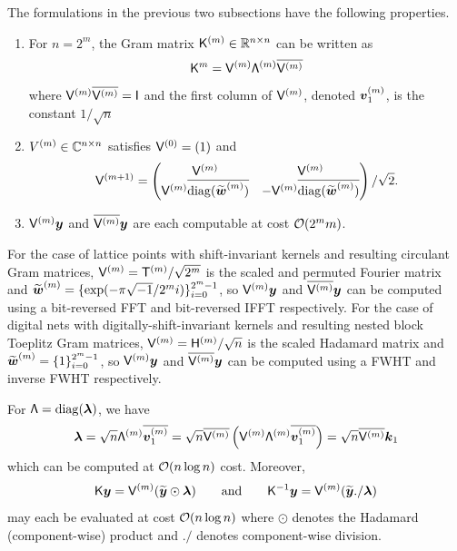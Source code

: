 \documentclass[acmsmall]{acmart}
\begin{document}
The formulations in the previous two subsections have the following properties. 
\begin{enumerate}
    \item For $n=2^m$, the Gram matrix ${\mathsf{K}}^{(m)} \in {\mathbb{R}}^{n \times n}$ can be written as
    $${\mathsf{K}}^{m} = {\mathsf{V}}^{(m)} {\mathsf{\Lambda}}^{(m)} \overline{{\mathsf{V}}^{(m)}}$$
    where ${\mathsf{V}}^{(m)} \overline{{\mathsf{V}}^{(m)}} = {\mathsf{I}}$ and the first column of ${\mathsf{V}}^{(m)}$, denoted ${\boldsymbol{v}}_1^{(m)}$, is the constant $1/\sqrt{n}$
    \item $V^{(m)} \in {\mathbb{C}}^{n \times n}$ satisfies ${\mathsf{V}}^{(0)} = (1)$ and 
    $${\mathsf{V}}^{(m+1)} = \begin{pmatrix} {\mathsf{V}}^{(m)} & {\mathsf{V}}^{(m)} \\  {\mathsf{V}}^{(m)} \overline{\mathrm{diag}({\widetilde{\boldsymbol{w}}}^{(m)})} & - {\mathsf{V}}^{(m)} \overline{\mathrm{diag}({\widetilde{\boldsymbol{w}}}^{(m)})} \end{pmatrix}/\sqrt{2}.$$
    \item ${\mathsf{V}}^{(m)} {\boldsymbol{y}}$ and $\overline{{\mathsf{V}}^{(m)}} {\boldsymbol{y}}$ are each computable at cost ${\mathcal{O}}(2^mm)$.
\end{enumerate}
For the case of lattice points with shift-invariant kernels and resulting circulant Gram matrices, ${\mathsf{V}}^{(m)} = {\mathsf{T}}^{(m)}/\sqrt{2^m}$ is the scaled and permuted Fourier matrix and ${\widetilde{\boldsymbol{w}}}^{(m)} = \{\exp(-\pi \sqrt{-1}/2^m i)\}_{i=0}^{2^m-1}$, so ${\mathsf{V}}^{(m)} {\boldsymbol{y}}$ and $\overline{{\mathsf{V}}^{(m)}} {\boldsymbol{y}}$ can be computed using a bit-reversed FFT and bit-reversed IFFT respectively. For the case of digital nets with 
digitally-shift-invariant kernels  and resulting nested block Toeplitz Gram matrices, ${\mathsf{V}}^{(m)} = {\mathsf{H}}^{(m)}/\sqrt{n}$ is the scaled Hadamard matrix and ${\widetilde{\boldsymbol{w}}}^{(m)} = \{1\}_{i=0}^{2^m-1}$, so ${\mathsf{V}}^{(m)} {\boldsymbol{y}}$ and $\overline{{\mathsf{V}}^{(m)}} {\boldsymbol{y}}$ can be computed using a FWHT and inverse FWHT respectively. 

For ${\mathsf{\Lambda}} = \mathrm{diag}({\boldsymbol{\lambda}})$, we have 
$${\boldsymbol{\lambda}} = \sqrt{n} {\mathsf{\Lambda}}^{(m)}\overline{{\boldsymbol{v}}_1^{(m)}} = \sqrt{n} \overline{{\mathsf{V}}^{(m)}} \left({\mathsf{V}}^{(m)} {\mathsf{\Lambda}}^{(m)} \overline{{\boldsymbol{v}}_1^{(m)}}\right) = \sqrt{n} \overline{{\mathsf{V}}^{(m)}} {\boldsymbol{k}}_1$$
which can be computed at ${\mathcal{O}}(n \log n)$ cost. Moreover, 
\begin{equation*}
    {\mathsf{K}} {\boldsymbol{y}} = {\mathsf{V}}^{(m)}({\widetilde{\boldsymbol{y}}} \odot {\boldsymbol{\lambda}}) \qquad \text{and}\qquad {\mathsf{K}}^{-1} {\boldsymbol{y}} = {\mathsf{V}}^{(m)} ({\widetilde{\boldsymbol{y}}} ./ {\boldsymbol{\lambda}})
\end{equation*}
may each be evaluated at cost ${\mathcal{O}}(n \log n)$ where $\odot$ denotes the Hadamard (component-wise) product and $./$ denotes component-wise division.
\end{document}
